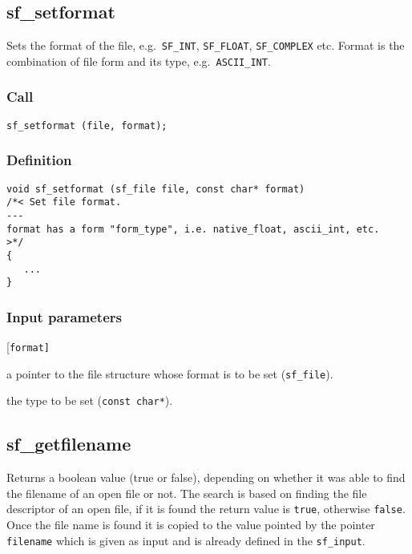 \subsection{{sf\_setformat}}
Sets the format of the file, e.g.~\texttt{SF\_INT}, \texttt{SF\_FLOAT}, \texttt{SF\_COMPLEX} etc. Format is the combination of file form and its type, e.g.~\texttt{ASCII\_INT}.

\subsubsection*{Call}
\begin{verbatim}sf_setformat (file, format);\end{verbatim}

\subsubsection*{Definition}
\begin{verbatim}
void sf_setformat (sf_file file, const char* format)
/*< Set file format.
---
format has a form "form_type", i.e. native_float, ascii_int, etc.
>*/
{    
   ...
}
\end{verbatim}

\subsubsection*{Input parameters}
\begin{desclist}{\tt }{\quad}[\tt format]
   \setlength\itemsep{0pt}
   \item[file] a pointer to the file structure whose format is to be set (\texttt{sf\_file}). 
   \item[format] the type to be set (\texttt{const char*}).
\end{desclist}




\subsection{{sf\_getfilename}}
Returns a boolean value (true or false), depending on whether it was able to find the filename of an open file or not. The search is based on finding the file descriptor of an open file, if it is found the return value is \texttt{true}, otherwise \texttt{false}. Once the file name is found it is copied to the value pointed by the pointer \texttt{filename} which is given as input and is already defined in the \texttt{sf\_input}. 

